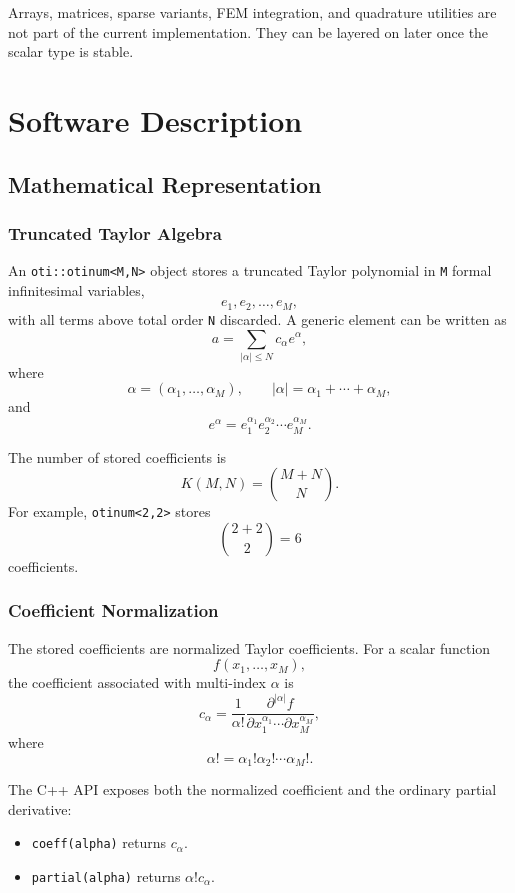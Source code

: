 \documentclass[11pt]{article}
\begin{document}
Arrays, matrices, sparse variants, FEM integration, and quadrature utilities
are not part of the current implementation. They can be layered on later once
the scalar type is stable.

\section{Software Description}

\subsection{Mathematical Representation}

\subsubsection{Truncated Taylor Algebra}

An \texttt{oti::otinum<M,N>} object stores a truncated Taylor polynomial in
\texttt{M} formal infinitesimal variables,
\[
    e_1, e_2, \ldots, e_M,
\]
with all terms above total order \texttt{N} discarded. A generic element can
be written as
\[
    a = \sum_{|\alpha| \leq N} c_\alpha e^\alpha,
\]
where
\[
    \alpha = (\alpha_1,\ldots,\alpha_M), \qquad
    |\alpha| = \alpha_1 + \cdots + \alpha_M,
\]
and
\[
    e^\alpha = e_1^{\alpha_1} e_2^{\alpha_2} \cdots e_M^{\alpha_M}.
\]

The number of stored coefficients is
\[
    K(M,N) = {M+N \choose N}.
\]
For example, \texttt{otinum<2,2>} stores
\[
    {2+2 \choose 2} = 6
\]
coefficients.

\subsubsection{Coefficient Normalization}

The stored coefficients are normalized Taylor coefficients. For a scalar
function
\[
    f(x_1,\ldots,x_M),
\]
the coefficient associated with multi-index \(\alpha\) is
\[
    c_\alpha =
    \frac{1}{\alpha!}
    \frac{\partial^{|\alpha|} f}
         {\partial x_1^{\alpha_1}\cdots \partial x_M^{\alpha_M}},
\]
where
\[
    \alpha! = \alpha_1! \alpha_2! \cdots \alpha_M!.
\]

The C++ API exposes both the normalized coefficient and the ordinary partial
derivative:
\begin{itemize}[noitemsep]
    \item \texttt{coeff(alpha)} returns \(c_\alpha\).
    \item \texttt{partial(alpha)} returns \(\alpha! c_\alpha\).
\end{itemize}
\end{document}
